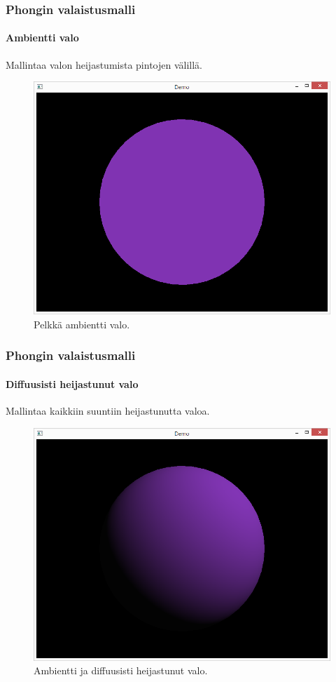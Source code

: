 \documentclass{beamer}
\begin{document}
\begin{frame}
\frametitle{Phongin valaistusmalli}
\framesubtitle{Ambientti valo}
Mallintaa valon heijastumista pintojen välillä.
\begin{figure}
\includegraphics[scale=0.3]{img/sphere_ambient.png}
\caption{Pelkkä ambientti valo.}
\end{figure}
\end{frame}

\begin{frame}
\frametitle{Phongin valaistusmalli}
\framesubtitle{Diffuusisti heijastunut valo}
Mallintaa kaikkiin suuntiin heijastunutta valoa.
\begin{figure}
\includegraphics[scale=0.3]{img/sphere_ambient_diffuse.png}
\caption{Ambientti ja diffuusisti heijastunut valo.}
\end{figure}
\end{frame}
\end{document}
